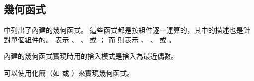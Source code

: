 \subsection[sec:geomtricFunc]{幾何函式}

中列出了內建的幾何函式。
這些函式都是按組件逐一運算的，其中的描述也是針對單個組件的。
 表示
 、 、  或 ；
而  則表示
 、 、  或 。

內建的幾何函式實現時用的捨入模式是捨入為最近偶數。

\startnotepar
可以使用化簡（如  或 ）來實現幾何函式。
\stopnotepar

{}
